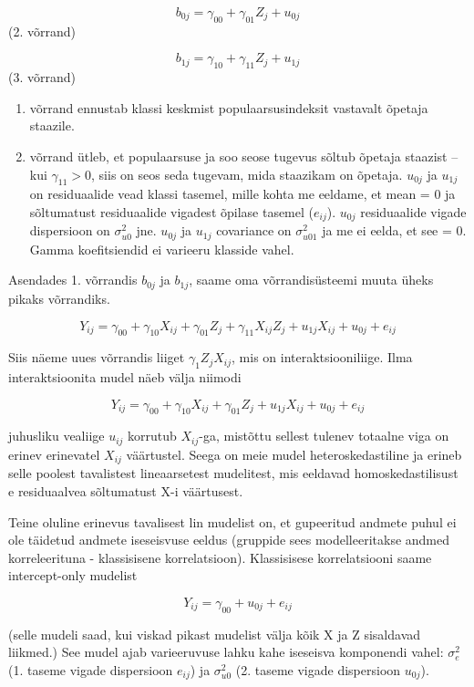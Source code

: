 \documentclass[]{book}
\providecommand{\tightlist}{%
  \setlength{\itemsep}{0pt}\setlength{\parskip}{0pt}}
\begin{document}
\[b_{0j} = \gamma_{00} + \gamma_{01} Z_j + u_{0j}\] (2. võrrand)

\[b_{1j} = \gamma_{10} + \gamma_{11} Z_j + u_{1j}\] (3. võrrand)

\begin{enumerate}
\def\labelenumi{\arabic{enumi}.}
\setcounter{enumi}{1}
\tightlist
\item
  võrrand ennustab klassi keskmist populaarsusindeksit vastavalt õpetaja
  staazile.
\item
  võrrand ütleb, et populaarsuse ja soo seose tugevus sõltub õpetaja
  staazist -- kui \(\gamma_{11} > 0\), siis on seos seda tugevam, mida
  staazikam on õpetaja. \(u_{0j}\) ja \(u_{1j}\) on residuaalide vead
  klassi tasemel, mille kohta me eeldame, et mean = 0 ja sõltumatust
  residuaalide vigadest õpilase tasemel (\(e_{ij}\)). \(u_{0j}\)
  residuaalide vigade dispersioon on \(\sigma^2_{u0}\) jne. \(u_{0j}\)
  ja \(u_{1j}\) covariance on \(\sigma^2_{u01}\) ja me ei eelda, et see
  = 0. Gamma koefitsiendid ei varieeru klasside vahel.
\end{enumerate}

Asendades 1. võrrandis \(b_{0j}\) ja \(b_{1j}\), saame oma
võrrandisüsteemi muuta üheks pikaks võrrandiks.

\[Y_{ij} = \gamma_{00} + \gamma_{10} X_{ij} + \gamma_{01} Z_j + \gamma_{11}X_{ij} Z_j + u_{1j} X_{ij} + u_{0j} + e_{ij}\]

Siis näeme uues võrrandis liiget \(\gamma_1 Z_j X_{ij}\), mis on
interaktsiooniliige. Ilma interaktsioonita mudel näeb välja niimodi

\[Y_{ij} = \gamma_{00} + \gamma_{10} X_{ij} + \gamma_{01} Z_j + u_{1j} X_{ij} + u_{0j} + e_{ij}\]

juhusliku vealiige \(u_{ij}\) korrutub \(X_{ij}\)-ga, mistõttu sellest
tulenev totaalne viga on erinev erinevatel \(X_{ij}\) väärtustel. Seega
on meie mudel heteroskedastiline ja erineb selle poolest tavalistest
lineaarsetest mudelitest, mis eeldavad homoskedastilisust e residuaalvea
sõltumatust X-i väärtusest.

Teine oluline erinevus tavalisest lin mudelist on, et gupeeritud andmete
puhul ei ole täidetud andmete iseseisvuse eeldus (gruppide sees
modelleeritakse andmed korreleerituna - klassisisene korrelatsioon).
Klassisisese korrelatsiooni saame intercept-only mudelist

\[Y_{ij} = \gamma_{00} + u_{0j} + e_{ij}\]

(selle mudeli saad, kui viskad pikast mudelist välja kõik X ja Z
sisaldavad liikmed.) See mudel ajab varieeruvuse lahku kahe iseseisva
komponendi vahel: \(\sigma^2_e\) (1. taseme vigade dispersioon
\(e_{ij}\)) ja \(\sigma^2_{u0}\) (2. taseme vigade dispersioon
\(u_{0j}\)).
\end{document}
